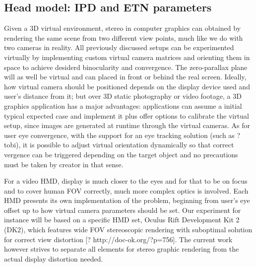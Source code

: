 \subsection{Head model: IPD and ETN parameters}
Given a 3D virtual environment, stereo in computer graphics can obtained by rendering the same scene from two different view points, much like we do with two cameras in reality. All previously discussed setups can be experimented virtually by implementing custom virtual camera matrices and orienting them in space to achieve desiderd binocularity and convergence. The zero-parallax plane will as well be virtual and can placed in front or behind the real screen. Ideally, how virtual camera should be positioned depends on the display device used and user's distance from it; but over 3D static photography or video footage, a 3D graphics application has a major advantages: applications can assume a initial typical expected case and implement it plus offer options to calibrate the virtual setup, since images are generated at runtime through the virtual cameras. As for user eye convergence, with the support for an eye tracking solution (such as ?tobi), it is possible to adjust virtual orientation dynamically so that correct vergence can be triggered depending on the target object and no precautions must be taken by creator in that sense.

For a video HMD, display is much closer to the eyes and for that to be on focus and to cover human FOV correctly, much more complex optics is involved. Each HMD presents its own implementation of the problem, beginning from user's eye offset up to how virtual camera parameters should be set. Our experiment for instance will be based on a specific HMD set, Oculus Rift Development Kit 2 (DK2), which features wide FOV stereoscopic rendering with suboptimal solution for correct view distortion [? http://doc-ok.org/?p=756]. The current work however strives to separate all elements for stereo graphic rendering from the actual display distortion needed.

